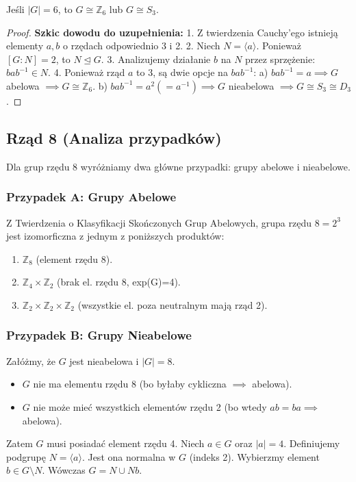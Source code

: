 \begin{theorem}
    Jeśli $|G| = 6$, to $G \cong \mathbb{Z}_6$ lub $G \cong S_3$.
\end{theorem}
\begin{proof}
    \textbf{Szkic dowodu do uzupełnienia:}
    1. Z twierdzenia Cauchy'ego istnieją elementy $a, b$ o rzędach odpowiednio 3 i 2.
    2. Niech $N = \langle a \rangle$. Ponieważ $[G:N]=2$, to $N \unlhd G$.
    3. Analizujemy działanie $b$ na $N$ przez sprzężenie: $bab^{-1} \in N$.
    4. Ponieważ rząd $a$ to 3, są dwie opcje na $bab^{-1}$:
       a) $bab^{-1} = a \implies G$ abelowa $\implies G \cong \mathbb{Z}_6$.
       b) $bab^{-1} = a^2 (= a^{-1}) \implies G$ nieabelowa $\implies G \cong S_3 \cong D_3$.
\end{proof}

\subsection{Rząd 8 (Analiza przypadków)}

Dla grup rzędu 8 wyróżniamy dwa główne przypadki: grupy abelowe i nieabelowe.

\subsubsection{Przypadek A: Grupy Abelowe}
Z Twierdzenia o Klasyfikacji Skończonych Grup Abelowych, grupa rzędu $8=2^3$ jest izomorficzna z jednym z poniższych produktów:
\begin{enumerate}
    \item $\mathbb{Z}_8$ (element rzędu 8).
    \item $\mathbb{Z}_4 \times \mathbb{Z}_2$ (brak el. rzędu 8, exp(G)=4).
    \item $\mathbb{Z}_2 \times \mathbb{Z}_2 \times \mathbb{Z}_2$ (wszystkie el. poza neutralnym mają rząd 2).
\end{enumerate}

\subsubsection{Przypadek B: Grupy Nieabelowe}
Załóżmy, że $G$ jest nieabelowa i $|G|=8$.
\begin{itemize}
    \item $G$ nie ma elementu rzędu 8 (bo byłaby cykliczna $\implies$ abelowa).
    \item $G$ nie może mieć wszystkich elementów rzędu 2 (bo wtedy $ab=ba \implies$ abelowa).
\end{itemize}
Zatem $G$ musi posiadać element rzędu 4. Niech $a \in G$ oraz $|a|=4$.
Definiujemy podgrupę $N = \langle a \rangle$. Jest ona normalna w $G$ (indeks 2).
Wybierzmy element $b \in G \setminus N$. Wówczas $G = N \cup Nb$.

